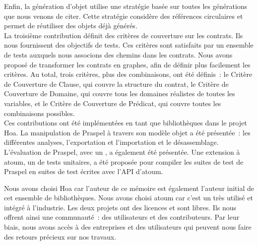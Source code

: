 Enfin, la génération d'objet utilise une stratégie basée sur toutes les
générations que nous venons de citer. Cette stratégie considère des références
circulaires et permet de réutiliser des objets déjà générés. \\

La troisième contribution définit des critères de couverture sur les contrats.
Ils nous fournissent des objectifs de tests. Ces critères sont satisfaits par un
ensemble de tests auxquels nous associons des chemins dans les contrats. Nous
avons proposé de transformer les contrats en graphes, afin de définir plus
facilement les critères. Au total, trois critères, plus des combinaisons, ont
été définis~: le Critère de Couverture de Clause, qui couvre la structure du
contrat, le Critère de Couverture de Domaine, qui couvre tous les domaines
réalistes de toutes les variables, et le Critère de Couverture de Prédicat, qui
couvre toutes les combinaisons possibles. \\

Ces contributions ont été implémentées en tant que bibliothèques dans le projet
Hoa. La manipulation de Praspel à travers son modèle objet a été présentée~: les
différentes analyses, l'exportation et l'importation et le désassemblage.
L'évaluation de Praspel, avec un , a
également été présentée. Une extension à atoum, un  de
tests unitaires, a été proposée pour compiler les suites de test de Praspel en
suites de test écrites avec l'API d'atoum.

Nous avons choisi Hoa car l'auteur de ce mémoire est également l'auteur initial
de cet ensemble de bibliothèques. Nous avons choisi atoum car c'est un
 très utilisé et intégré à l'industrie. Les deux projets
ont des licences  et sont libres. Ils nous offrent ainsi
une communauté~: des utilisateurs et des contributeurs. Par leur biais, nous
avons accès à des entreprises et des utilisateurs qui peuvent nous faire des
retours précieux sur nos travaux. \\

